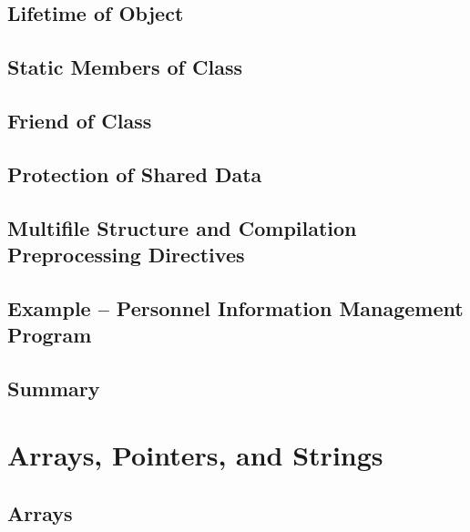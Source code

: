 \documentclass[a4paper]{article}
\begin{document}
\subsection{Lifetime of Object}

\subsection{Static Members of Class}

\subsection{Friend of Class}

\subsection{Protection of Shared Data}

\subsection{Multifile Structure and Compilation Preprocessing Directives}

\subsection{Example – Personnel Information Management Program}

\subsection{Summary}


\newpage
\section{Arrays, Pointers, and Strings}
\subsection{Arrays}
\end{document}
